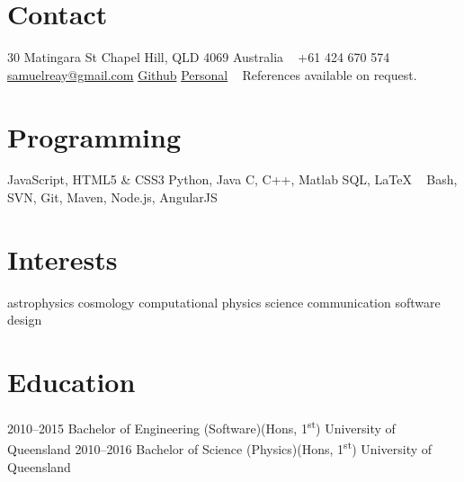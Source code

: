 \documentclass[]{friggeri-cv} %
\begin{document}


\begin{aside} %
\section{Contact}
30 Matingara St
Chapel Hill, QLD 4069
Australia
~
+61 424 670 574
~
\href{mailto:samuelreay@gmail.com}{samuelreay@gmail.com}
\href{https://github.com/samreay}{Github}
\href{https://Samreay.github.io}{Personal}
~
References available on request.
~
\section{Programming}
JavaScript,
HTML5 \& CSS3
Python, Java
C, C++, Matlab
SQL, LaTeX
~
Bash, SVN, Git, 
Maven, Node.js, AngularJS
~
\section{Interests}
astrophysics
cosmology 
 computational physics 
  science communication 
   software design
\end{aside}



\section{Education}

\begin{entrylist}
\entrysmall
{2010--2015}
{Bachelor of Engineering {\normalfont (Software)(Hons, 1\textsuperscript{st})}}
{University of Queensland}
{}
\entrysmall
{2010--2016}
{Bachelor of Science {\normalfont (Physics)(Hons, 1\textsuperscript{st})}}
{University of Queensland}
{}
\end{entrylist}

\end{document}
